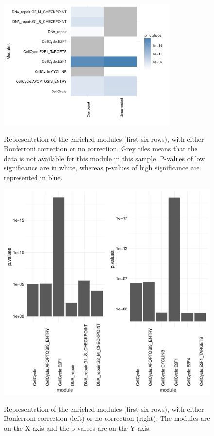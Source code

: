 \begin{figure}[h!]
	\centering
    \caption{Representation of the enriched modules (first six rows), with
    either Bonferroni correction or no correction. Grey tiles means that the
    data is not available for this module in this sample. P-values of low
    significance are in white, whereas p-values of high significance are
    represented in blue.}
    \includegraphics[width=0.8\textwidth]{figures/comparison_corrected_unc.pdf}
    \label{fig:heatm}

\end{figure}


\begin{figure}[h!]
	\centering
	\caption{Representation of the enriched modules (first six rows), with either Bonferroni correction (left) or no correction (right). The modules are on the X axis and the p-values are on the Y axis.  }
	\includegraphics[width=\textwidth]{figures/comparison_corrected_unc_bars.pdf}
	\label{fig:barp}

\end{figure}




